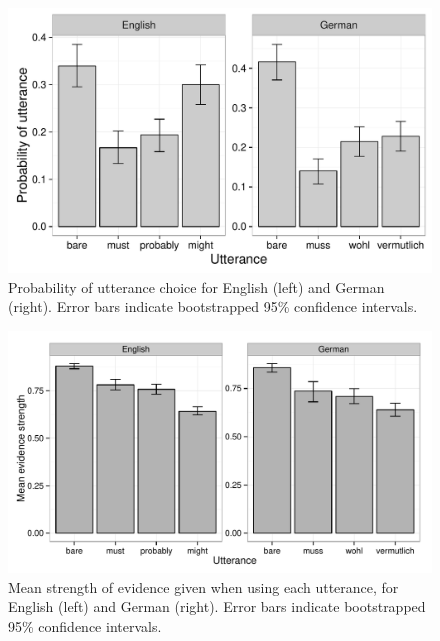 \documentclass[11pt]{article}
\begin{document}
\begin{figure}
\centering
\includegraphics[width=.9\textwidth]{pics/production-distribution}
\caption{Probability of utterance choice for English (left) and German (right). Error bars indicate bootstrapped 95\% confidence intervals.}
\label{fig:utterances}
\end{figure}

\begin{figure}
\centering
\includegraphics[width=.9\textwidth]{pics/mean-production-evidence}\caption{Mean strength of evidence given when using each utterance, for English (left) and German (right). Error bars indicate bootstrapped 95\% confidence intervals.}
\label{fig:utterances-estrength}
\end{figure}
\end{document}
